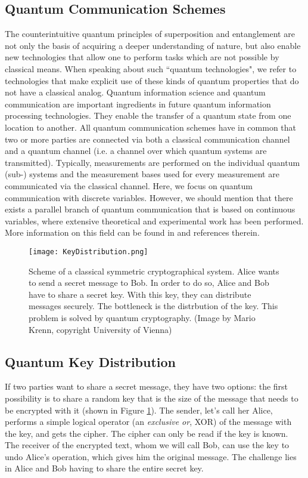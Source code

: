 \documentclass{article}
\begin{document}
\subsection{Quantum Communication Schemes}
The counterintuitive quantum principles of superposition and entanglement are not only the basis of acquiring a deeper understanding of nature, but also enable new technologies that allow one to perform tasks which are not possible by classical means. When speaking about such ``quantum technologies", we refer to technologies that make explicit use of these kinds of quantum properties that do not have a classical analog.
Quantum information science and quantum communication are important ingredients in future quantum information processing technologies. They enable the transfer of a quantum state from one location to another. All quantum communication schemes have in common that two or more parties are connected via both a classical communication channel and a quantum channel (i.e. a channel over which quantum systems are transmitted). Typically, measurements are performed on the individual quantum (sub-) systems and the measurement bases used for every measurement are communicated via the classical channel. Here, we focus on quantum communication with discrete variables. However, we should mention that there exists a parallel branch of quantum communication that is based on continuous variables, where extensive theoretical and experimental work has been performed. More information on this field can be found in \cite{Weedbrook:2012fe} and references therein. 

\begin{figure}[h!]
\centering
\texttt{[image: KeyDistribution.png]}
\caption{Scheme of a classical symmetric cryptographical system. Alice wants to send a secret message to Bob. In order to do so, Alice and Bob have to share a secret key. With this key, they can distribute messages securely. The bottleneck is the distrbution of the key. This problem is solved by quantum cryptography.  (Image by Mario Krenn, copyright University of Vienna)}
\label{fig:symmCrypt}
\end{figure}

\subsection{Quantum Key Distribution}
If two parties want to share a secret message, they have two options: the first possibility is to share a random key that is the size of the message that needs to be encrypted with it (shown in Figure \ref{fig:symmCrypt}). The sender, let's call her Alice, performs a simple logical operator (an \textit{exclusive or}, XOR) of the message with the key, and gets the cipher. The cipher can only be read if the key is known. The receiver of the encrypted text, whom we will call Bob, can use the key to undo Alice's operation, which gives him the original message. The challenge lies in Alice and Bob having to share the entire secret key. 
\end{document}
